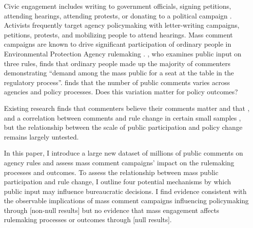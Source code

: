 \documentclass{article}
\begin{document}
Civic engagement includes writing to government officials, signing petitions, attending hearings, attending protests, or donating to a political campaign \citep{Verba1987}. %
Activists frequently target agency policymaking with letter-writing campaigns, petitions, protests, and mobilizing people to attend hearings. 
Mass comment campaigns are known to drive significant participation of ordinary people in Environmental Protection Agency rulemaking \citet{Potter2017, Balla2018}. \citet{Cuellar2005}, who examines public input on three rules, finds that ordinary people made up the majority of commenters demonstrating ``demand among the mass public for a seat at the table in the regulatory process''. \citet{Moore2017} finds that the number of public comments varies across agencies and policy processes. Does this variation matter for policy outcomes?

Existing research finds that commenters believe their comments matter and that 
\citep{Yackee2015JPART}, %
and a correlation between comments and rule change in certain small samples
\citep{Shapiro2008}, but the relationship between the scale of public participation and policy change remains largely untested. 

In this paper, I introduce a large new dataset of millions of public comments on agency rules and assess mass comment campaigns' impact on the rulemaking processes and outcomes. To assess the relationship between mass public participation and rule change, I outline four potential mechanisms by which public input may influence bureaucratic decisions. I find evidence consistent with the observable implications of mass comment campaigns influencing policymaking through [non-null results] but no evidence that mass engagement affects rulemaking processes or outcomes through [null results].


\singlespace
\small
 

\end{document}
